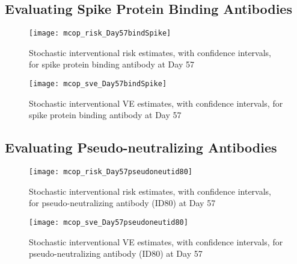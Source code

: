 \subsection{Evaluating Spike Protein Binding Antibodies}\label{spba-day57}

\begin{figure}[H]
  \centering
  \texttt{[image: mcop\_risk\_Day57bindSpike]}
  \caption{Stochastic interventional risk estimates, with confidence intervals,
  for spike protein binding antibody at Day 57}
  \label{fig:marker1-risk-day57}
\end{figure}

\begin{figure}[H]
  \centering
  \texttt{[image: mcop\_sve\_Day57bindSpike]}
  \caption{Stochastic interventional VE estimates, with confidence intervals,
    for spike protein binding antibody at Day 57}
  \label{fig:marker1-sve-day57}
\end{figure}

\subsection{Evaluating Pseudo-neutralizing Antibodies}\label{psna-day57}

\begin{figure}[H]
  \centering
  \texttt{[image: mcop\_risk\_Day57pseudoneutid80]}
  \caption{Stochastic interventional risk estimates, with confidence intervals,
  for pseudo-neutralizing antibody (ID80) at Day 57}
  \label{fig:marker4-risk-day57}
\end{figure}

\begin{figure}[H]
  \centering
  \texttt{[image: mcop\_sve\_Day57pseudoneutid80]}
  \caption{Stochastic interventional VE estimates, with confidence intervals,
  for pseudo-neutralizing antibody (ID80) at Day 57}
  \label{fig:marker4-sve-day57}
\end{figure}
